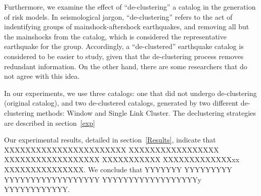 Furthermore, we examine the effect of ``de-clustering'' a catalog in
the generation of risk models. In seismological jargon,
``de-clustering'' refers to the act of indentifying groups of
mainshock-aftershock earthquakes, and removing all but the mainshocks
from the catalog, which is considered the representative earthquake
for the group. Accordingly, a ``de-clustered'' earthquake catalog is
considered to be easier to study, given that the de-clustering process
removes redundant information. On the other hand, there are some
researchers that do not agree with this idea.

In our experiments, we use three catalogs: one that did not undergo
de-clustering (original catalog), and two de-clustered catalogs,
generated by two different de-clustering methods: Window and Single
Link Cluster. The declustering strategies are described in
section~\ref{exp}

Our experimental results, detailed in section~\ref{Results}, indicate
that XXXXXXXXXXXXXXXXXXXXXXX XXXXXXXXXXXXXXXXX XXXXXXXXXXXXXXXXXX
XXXXXXXXXXX XXXXXXXXXXXXXxx XXXXXXXXXXXXXXX. We conclude that YYYYYYY
YYYYYYYYY YYYYYYYYYYYYYYYYYY YYYYYYYYYYYYYYYYYYy YYYYYYYYYYYY.


